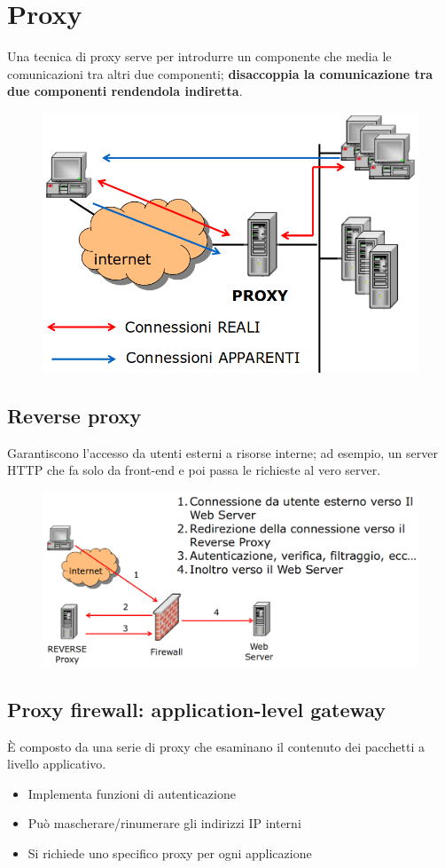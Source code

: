 \section{Proxy}
Una tecnica di proxy serve per introdurre un componente che media le comunicazioni 
tra altri due componenti; \textbf{disaccoppia la comunicazione tra due componenti 
rendendola indiretta}.

\begin{figure}[H]
    \centering
    \includegraphics[width=0.8\linewidth]{chapters/12/images/proxy.png}
\end{figure}

\subsection{Reverse proxy}
Garantiscono l'accesso da utenti esterni a risorse interne; ad esempio, 
un server HTTP che fa solo da front-end e poi passa le richieste 
al vero server.

\begin{figure}[H]
    \centering
    \includegraphics[width=0.9\linewidth]{chapters/12/images/reverse-proxy.png}
\end{figure}

\subsection{Proxy firewall: application-level gateway}
È composto da una serie di proxy che esaminano il contenuto dei pacchetti 
a livello applicativo.
\begin{itemize}
    \item Implementa funzioni di autenticazione 
    \item Può mascherare/rinumerare gli indirizzi IP interni 
    \item Si richiede uno specifico proxy per ogni applicazione
\end{itemize}


